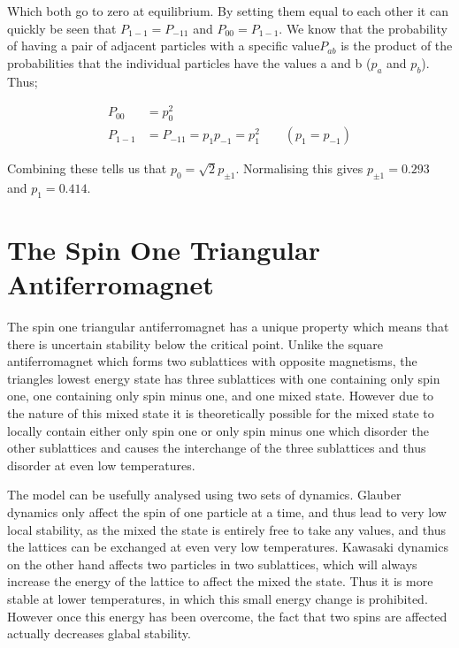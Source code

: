 \documentclass[]{article}
\begin{document}
Which both go to zero at equilibrium. By setting them equal to each other it can quickly be seen that $P_{1-1}=P_{-11}$ and $P_{00} = P_{1-1}$. We know that the probability of having a pair of adjacent particles with a specific value$P_{ab}$ is the product of the probabilities that the individual particles have the values a and b ($p_{a}$ and $p_{b}$). Thus;

\begin{align}
P_{00} &= p_{0}^{2} \\
P_{1-1} &= P_{-11} = p_{1}p_{-1} = p_{1}^2
\quad\quad (p_{1}=p_{-1})
\end{align}

Combining these tells us that $p_{0} = \sqrt{2}p_{\pm1}$. Normalising this gives $p_{\pm1} = 0.293$ and $p_{1} = 0.414$.


\section{The Spin One Triangular Antiferromagnet}

The spin one triangular antiferromagnet has a unique property which means that there is uncertain stability below the critical point. Unlike the square antiferromagnet which forms two sublattices with opposite magnetisms, the triangles lowest energy state has three sublattices with one containing only spin one, one containing only spin minus one, and one mixed state. However due to the nature of this mixed state it is theoretically possible for the mixed state to locally contain either only spin one or only spin minus one which disorder the other sublattices and causes the interchange of the three sublattices and thus disorder at even low temperatures.

The model can be usefully analysed using two sets of dynamics. Glauber dynamics only affect the spin of one particle at a time, and thus lead to very low local stability, as the mixed the state is entirely free to take any values, and thus the lattices can be exchanged at even very low temperatures. Kawasaki dynamics on the other hand affects two particles in two sublattices, which will always increase the energy of the lattice to affect the mixed the state. Thus it is more stable at lower temperatures, in which this small energy change is prohibited. However once this energy has been overcome, the fact that two spins are affected actually decreases glabal stability.
\end{document}
